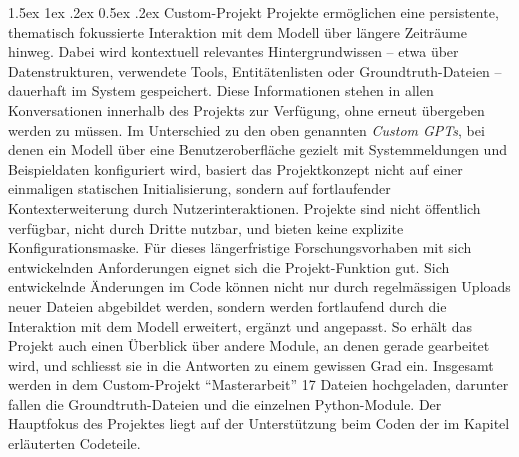 \documentclass[12pt, a4paper, ngerman, bidi=default]{article}
\makeatletter
\let\oldparagraph\paragraph%
\renewcommand{\paragraph}{
    \@ifstar%
      \xxxParagraphStar%
      \xxxParagraphNoStar%
 }
\newcommand{\xxxParagraphStar}[1]{\oldparagraph*{#1}\mbox{}}
\newcommand{\xxxParagraphNoStar}[1]{\oldparagraph{#1}\mbox{}}
\renewcommand\paragraph{\@startsection{paragraph}{4}{0em}%
  {1.5ex \@plus1ex \@minus.2ex}%
  {0.5ex \@plus.2ex}%
  {\normalfont\normalsize\bfseries\itshape}}
\makeatother
\begin{document}
\paragraph{Custom-Projekt}
Projekte ermöglichen eine persistente, thematisch fokussierte Interaktion mit dem Modell über längere Zeiträume hinweg. Dabei wird kontextuell relevantes Hintergrundwissen – etwa über Datenstrukturen, verwendete Tools, Entitätenlisten oder Groundtruth-Dateien – dauerhaft im System gespeichert. Diese Informationen stehen in allen Konversationen innerhalb des Projekts zur Verfügung, ohne erneut übergeben werden zu müssen. Im Unterschied zu den oben genannten \textit{Custom GPTs}, bei denen ein Modell über eine Benutzeroberfläche gezielt mit Systemmeldungen und Beispieldaten konfiguriert wird, basiert das Projektkonzept nicht auf einer einmaligen statischen Initialisierung, sondern auf fortlaufender Kontexterweiterung durch Nutzerinteraktionen. Projekte sind nicht öffentlich verfügbar, nicht durch Dritte nutzbar, und bieten keine explizite Konfigurationsmaske. 
Für dieses längerfristige Forschungsvorhaben mit sich entwickelnden Anforderungen eignet sich die Projekt-Funktion gut. Sich entwickelnde Änderungen im Code können nicht nur durch regelmässigen Uploads neuer Dateien abgebildet werden, sondern werden fortlaufend durch die Interaktion mit dem Modell erweitert, ergänzt und angepasst. So erhält das Projekt auch einen Überblick über andere Module, an denen gerade gearbeitet wird, und schliesst sie in die Antworten zu einem gewissen Grad ein. Insgesamt werden in dem Custom-Projekt \enquote{Masterarbeit} 17 Dateien hochgeladen, darunter fallen die Groundtruth-Dateien und die einzelnen Python-Module. Der Hauptfokus des Projektes liegt auf der Unterstützung beim Coden der im Kapitel  erläuterten Codeteile.
\end{document}
